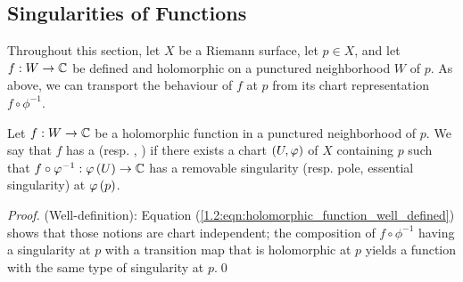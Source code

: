 \documentclass[../Moduli_Spaces_of_Riemann_Surfaces.tex]{subfiles}
\begin{document}
    \subsection{Singularities of Functions}
    Throughout this section, let $X$ be a Riemann surface, let $p\in X$, and let $f:W\to\mathbb{C}$ be defined and holomorphic on a punctured neighborhood $W$ of $p$. As above, we can transport the behaviour of $f$ at $p$ from its chart representation $f\circ\phi^{-1}$.
    \begin{definition}
        Let $f:W\to\mathbb{C}$ be a holomorphic function in a punctured neighborhood of $p$. We say that $f$ has a  (resp. , )  if there exists a chart $\left(U,\varphi\right)$ of $X$ containing $p$ such that $f\circ\varphi^{-1}:\varphi\left(U\right)\to\mathbb{C}$ has a removable singularity (resp. pole, essential singularity) at $\varphi\left(p\right)$.
    \end{definition}
    \vspace{-0.05in}
    \begin{proof}
        (Well-definition): Equation (\ref{1.2:eqn:holomorphic_function_well_defined}) shows that those notions are chart independent; the composition of $f\circ\phi^{-1}$ having a singularity at $p$ with a transition map that is holomorphic at $p$ yields a function with the same type of singularity at $p$.\qed
    \end{proof}
\end{document}
